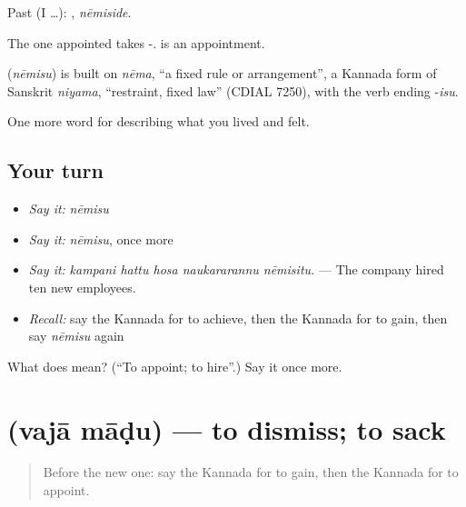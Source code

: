 Past (I …): , \emph{nēmiside}.

The one appointed takes -.  is an appointment.

\begin{cousinweb}
\textbf{} (\emph{nēmisu}) is built on \emph{nēma}, \textquotedblleft{}a fixed rule or arrangement\textquotedblright{}, a Kannada form of Sanskrit \emph{niyama}, \textquotedblleft{}restraint, fixed law\textquotedblright{} (CDIAL 7250), with the verb ending -\emph{isu}.
\end{cousinweb}

\begin{grammarlens}[title={What you've built}]
One more word for describing what you lived and felt.
\end{grammarlens}

\subsection*{Your turn}
\begin{itemize}
\raggedright
  \item \emph{Say it:} \emph{nēmisu}
  \item \emph{Say it:} \emph{nēmisu}, once more
  \item \emph{Say it:} \emph{kampani hattu hosa naukararannu nēmisitu.} — The company hired ten new employees.
  \item \emph{Recall:} say the Kannada for to achieve, then the Kannada for to gain, then say \emph{nēmisu} again
\end{itemize}

\begin{tcolorbox}[breakable,colback=teal!4,colframe=teal!35!black,title={Before you move on}]
What does  mean? (\textquotedblleft{}To appoint; to hire\textquotedblright{}.) Say it once more.
\end{tcolorbox}
\section[\texorpdfstring{\kn{ವಜಾ} \kn{ಮಾಡು} (vajā māḍu)}{ವಜಾ ಮಾಡು (vajā māḍu)}]{  (vajā māḍu) — to dismiss; to sack}

\label{lesson:KA-C518-vaja-madu}



\begin{quote}
Before the new one: say the Kannada for to gain, then the Kannada for to appoint.
\end{quote}

